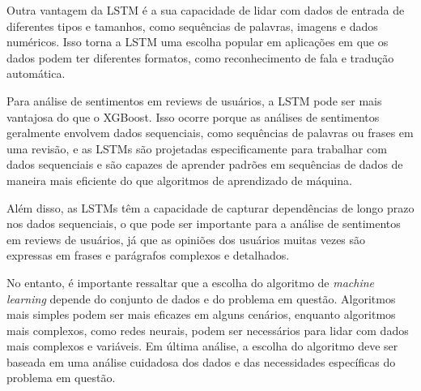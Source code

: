 Outra vantagem da LSTM é a sua capacidade de lidar com dados de entrada de diferentes tipos e tamanhos, como sequências de palavras, imagens e dados numéricos. Isso torna a LSTM uma escolha popular em aplicações em que os dados podem ter diferentes formatos, como reconhecimento de fala e tradução automática.

Para análise de sentimentos em reviews de usuários, a LSTM pode ser mais vantajosa do que o XGBoost. Isso ocorre porque as análises de sentimentos geralmente envolvem dados sequenciais, como sequências de palavras ou frases em uma revisão, e as LSTMs são projetadas especificamente para trabalhar com dados sequenciais e são capazes de aprender padrões em sequências de dados de maneira mais eficiente do que algoritmos de aprendizado de máquina.

Além disso, as LSTMs têm a capacidade de capturar dependências de longo prazo nos dados sequenciais, o que pode ser importante para a análise de sentimentos em reviews de usuários, já que as opiniões dos usuários muitas vezes são expressas em frases e parágrafos complexos e detalhados.

No entanto, é importante ressaltar que a escolha do algoritmo de \textit{machine learning} depende do conjunto de dados e do problema em questão. Algoritmos mais simples podem ser mais eficazes em alguns cenários, enquanto algoritmos mais complexos, como redes neurais, podem ser necessários para lidar com dados mais complexos e variáveis. Em última análise, a escolha do algoritmo deve ser baseada em uma análise cuidadosa dos dados e das necessidades específicas do problema em questão.